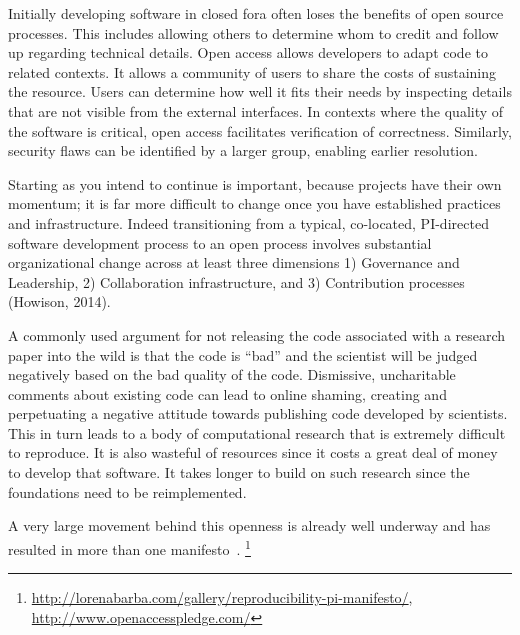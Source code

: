 \documentclass[a4paper,UKenglish]{dagman}
\begin{document}
Initially developing software in closed fora often loses the benefits of open source processes. This includes allowing others to determine whom to credit and follow up regarding technical details. Open access allows developers to adapt code to related contexts. It allows a community of users to share the costs of sustaining the resource. Users can determine how well it fits their needs by inspecting details that are not visible from the external interfaces. In contexts where the quality of the software is critical, open access facilitates verification of correctness. Similarly, security flaws can be identified by a larger group, enabling earlier resolution.

Starting as you intend to continue is important, because projects have their own momentum; it is far more difficult to change once you have established practices and infrastructure. Indeed transitioning from a typical, co-located, PI-directed software development process to an open process involves substantial organizational change across at least three dimensions 1) Governance and Leadership, 2) Collaboration infrastructure, and 3) Contribution processes (Howison, 2014). 

A commonly used argument for not releasing the code associated with a research paper into the wild is that the code is ``bad'' and the scientist will be judged negatively based on the bad quality of the code.
Dismissive, uncharitable comments about existing code can lead to online shaming, creating and perpetuating a negative attitude towards publishing code developed by scientists.
This in turn leads to a body of computational research that is extremely difficult to reproduce. It is also wasteful of resources since it costs a great deal of money to develop that software. It takes longer to build on such research since the foundations need to be reimplemented.

A very large movement behind this openness is already well underway and has resulted in more than one manifesto~\cite{barba_reproducibility_2012,alex_holcombe_open_2011}.%
\footnote{\url{http://lorenabarba.com/gallery/reproducibility-pi-manifesto/}, \url{http://www.openaccesspledge.com/}}
\end{document}
